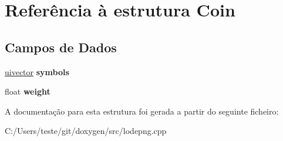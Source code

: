 \hypertarget{struct_coin}{\section{Referência à estrutura Coin}
\label{struct_coin}
}
\subsection*{Campos de Dados}
\begin{DoxyCompactItemize}
\item 
\hypertarget{struct_coin_aebcc69a36ae5072bcb13188418750393}{\hyperlink{structuivector}{uivector} {\bfseries symbols}}\label{struct_coin_aebcc69a36ae5072bcb13188418750393}

\item 
\hypertarget{struct_coin_a8128625c9e3fd04c27b82957732d8781}{float {\bfseries weight}}\label{struct_coin_a8128625c9e3fd04c27b82957732d8781}

\end{DoxyCompactItemize}


A documentação para esta estrutura foi gerada a partir do seguinte ficheiro\-:\begin{DoxyCompactItemize}
\item 
C\-:/\-Users/teste/git/doxygen/src/lodepng.\-cpp\end{DoxyCompactItemize}
